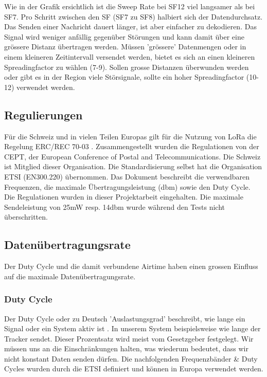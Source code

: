 \documentclass[11pt,english,german]{report}
\theoremstyle{definition}
\begin{document}
\noindent
Wie in der Grafik ersichtlich ist die Sweep Rate bei SF12 viel langsamer als bei SF7. Pro Schritt zwischen den SF (SF7 zu SF8) halbiert sich der Datendurchsatz. Das Senden einer Nachricht dauert länger, ist aber einfacher zu dekodieren. Das Signal wird weniger anfällig gegenüber Störungen und kann damit über eine grössere Distanz übertragen werden. Müssen 'grössere' Datenmengen oder in einem kleineren Zeitintervall versendet werden, bietet es sich an einen kleineren Spreadingfactor zu wählen (7-9).  Sollen grosse Distanzen überwunden werden oder gibt es in der Region viele Störsignale, sollte ein hoher Spreadingfactor (10-12) verwendet werden.

\newpage
\subsection{Regulierungen}
Für die Schweiz und in vielen Teilen Europas gilt für die Nutzung von LoRa die Regelung ERC/REC 70-03 \cite{regulations}. Zusammengestellt wurden die Regulationen von der CEPT, der European Conference of Postal and Telecommunications. Die Schweiz ist Mitglied dieser Organisation. Die Standardisierung selbst hat die Organisation ETSI (EN300.220) übernommen. Das Dokument beschreibt die verwendbaren Frequenzen, die maximale Übertragungsleistung (dbm) sowie den Duty Cycle.\\[0.3cm]
Die Regulationen wurden in dieser Projektarbeit eingehalten. Die maximale Sendeleistung von 25mW resp. 14dbm wurde während den Tests nicht überschritten.

\subsection{Datenübertragungsrate}
Der Duty Cycle und die damit verbundene Airtime haben einen grossen Einfluss auf die maximale Datenübertragungsrate. 
\subsubsection{Duty Cycle}
Der Duty Cycle oder zu Deutsch 'Auslastungsgrad' beschreibt, wie lange ein Signal oder ein System aktiv ist \cite{wikiduty}. In unserem System beispielsweise wie lange der Tracker sendet. Dieser Prozentsatz wird meist vom Gesetzgeber festgelegt. Wir müssen uns an die Einschränkungen halten, was wiederum bedeutet, dass wir nicht konstant Daten senden dürfen. Die nachfolgenden Frequenzbänder \& Duty Cycles wurden durch die ETSI definiert und können in Europa verwendet werden\cite{lorawanfreq}.
\end{document}
